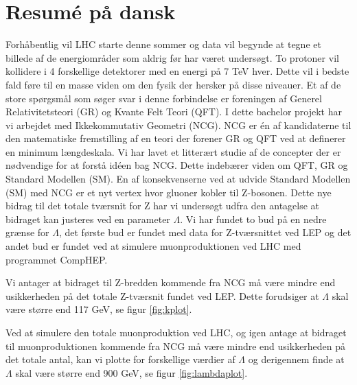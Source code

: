 \section{Resumé på dansk}
Forhåbentlig vil LHC starte denne sommer og data vil begynde at tegne et billede af de energiområder som aldrig før har været undersøgt. To protoner vil kollidere i 4 forskellige detektorer med en energi på 7 TeV hver. Dette vil i bedste fald føre til en masse viden om den fysik der hersker på disse niveauer. Et af de store spørgsmål som søger svar i denne forbindelse er foreningen af Generel Relativitetsteori (GR) og Kvante Felt Teori (QFT). I dette bachelor projekt har vi arbejdet med Ikkekommutativ Geometri (NCG). NCG er én af kandidaterne til den matematiske fremstilling af en teori der forener GR og QFT ved at definerer en minimum længdeskala. Vi har lavet et litterært studie af de concepter der er nødvendige for at forstå idéen bag NCG. Dette indebærer viden om QFT, GR og Standard Modellen (SM). En af konsekvenserne ved at udvide Standard Modellen (SM) med NCG er et nyt vertex hvor gluoner kobler til Z-bosonen. Dette nye bidrag til det totale tværsnit for Z har vi undersøgt udfra den antagelse at bidraget kan justeres ved en parameter $\Lambda$. Vi har fundet to bud på en nedre grænse for $\Lambda$, det første bud er fundet med data for Z-tværsnittet ved LEP og det andet bud er fundet ved at simulere muonproduktionen ved LHC med programmet CompHEP. 

Vi antager at bidraget til Z-bredden kommende fra NCG må være mindre end usikkerheden på det totale Z-tværsnit fundet ved LEP. Dette forudsiger at $\Lambda$ skal være større end 117 GeV, se figur \ref{fig:kplot}. 

Ved at simulere den totale muonproduktion ved LHC, og igen antage at bidraget til muonproduktionen kommende fra NCG må være mindre end usikkerheden på det totale antal, kan vi plotte for forskellige værdier af $\Lambda$ og derigennem finde at $\Lambda$ skal være større end 900 GeV, se figur \ref{fig:lambdaplot}. 
